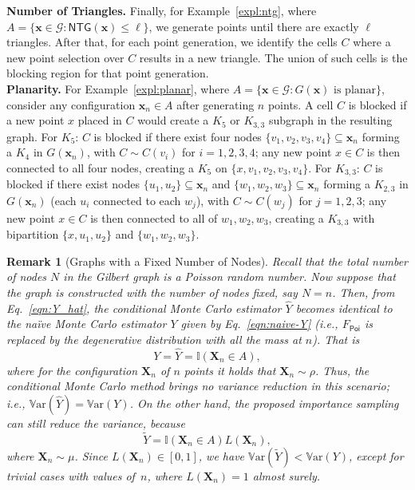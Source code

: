 \documentclass[pdflatex, sn-mathphys-ay]{sn-jnl}%
\newcommand{\ind}{\mathbb{I}}
\renewcommand{\v}[1]{\boldsymbol{#1}}
\newcommand{\poi}{\textsf{Poi}}
\newcommand{\mx}{\v{x}}
\newcommand{\mX}{\v{X}}
\newcommand{\scG}{\mathscr{G}}
\newcommand{\lt}{\left}
\newcommand{\rt}{\right}
\newcommand{\wt}{\widetilde}
\newcommand{\wh}{\widehat}
\newcommand{\var}{\mathbb{V}\mathrm{ar}}
\newcommand{\ntg}{\mathsf{NTG}}
\theoremstyle{thmstyleone}%
\theoremstyle{thmstyletwo}%
\newtheorem{remark}{Remark}%
\theoremstyle{thmstylethree}%
\begin{document}
\noindent
{\bf Number of Triangles.}
Finally, for Example~\ref{expl:ntg}, where $A = \{ \mx \in \scG : \ntg\lt( \mx\rt) \leq \ell \}$,  we generate points until there are exactly $\ell$ triangles.
After that, for each point generation, we identify the cells $C$ where a new point selection over $C$
results in a new triangle. The union of such cells is the blocking region for that point generation.\\

\noindent
{\bf Planarity.}                                                               
  For Example~\ref{expl:planar}, where $A = \{ \mx \in \scG : G(\mx) \text{ is
  planar}\}$,                                                                    
  consider any configuration $\mx_n \in A$ after generating $n$ points.
  A cell $C$ is blocked if a new point $x$ placed in $C$ would create a $K_5$ or
  $K_{3,3}$
  subgraph in the resulting graph.
  For $K_5$: $C$ is blocked if there exist four nodes
  $\{v_1, v_2, v_3, v_4\} \subseteq \mx_n$ forming a $K_4$ in $G(\mx_n)$,
  with $C \sim C(v_i)$ for $i = 1, 2, 3, 4$;
  any new point $x \in C$ is then connected to all four nodes,
  creating a $K_5$ on $\{x, v_1, v_2, v_3, v_4\}$.
  For $K_{3,3}$: $C$ is blocked if there exist nodes
  $\{u_1, u_2\} \subseteq \mx_n$ and $\{w_1, w_2, w_3\} \subseteq \mx_n$
  forming a $K_{2,3}$ in $G(\mx_n)$ (each $u_i$ connected to each $w_j$),
  with $C \sim C(w_j)$ for $j = 1, 2, 3$;
  any new point $x \in C$ is then connected to all of $w_1, w_2, w_3$,
  creating a $K_{3,3}$ with bipartition $\{x, u_1, u_2\}$ and $\{w_1, w_2,
  w_3\}$.

\begin{remark}[Graphs with a Fixed Number of Nodes]
\normalfont
Recall that the total number of nodes $N$ in the Gilbert graph is a Poisson random number. Now suppose that the graph is constructed with the number of nodes fixed, say $N = n$. Then, from Eq.~\eqref{eqn:Y_hat}, the conditional Monte Carlo estimator $\wh Y$ becomes identical to {  the na\"{i}ve Monte Carlo} estimator $Y$ given by Eq.~\eqref{eqn:naive-Y} (i.e., $F_\poi$ is replaced by the degenerative distribution with all the mass at $n$). That is 
\[
Y = \wh Y = \ind(\mX_n \in A),
\]
where for the configuration {  $\mX_n$ of $n$ points} it holds that $\mX_n \sim \rho$. Thus, the conditional Monte Carlo method brings no variance reduction in this scenario; i.e., $\var(\wh Y) = \var(Y)$.  On the other hand, the  proposed importance sampling can still reduce the variance, because
\[
\wt Y = \ind(\mX_n \in A)L(\mX_n),
\]
where $\mX_n \sim \mu$.
Since $L(\mX_n) \in [0, 1]$, we have $\var(\wt Y) < \var(Y)$, except for trivial cases with values of~$n$, where $L(\mX_n) = 1$ almost surely.
\end{remark}
\end{document}
